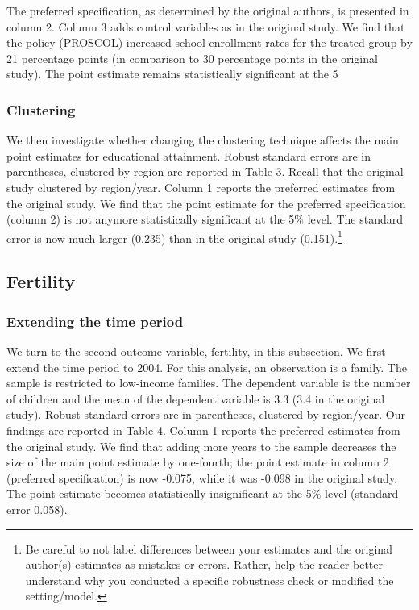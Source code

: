 \documentclass[12pt,a4paper]{article}
\begin{document}
The preferred specification, as determined by the original authors, is presented in column 2. Column 3 adds control variables as in the original study. We find that the policy (PROSCOL) increased school enrollment rates for the treated group by 21 percentage points (in comparison to 30 percentage points in the original study). The point estimate remains statistically significant at the 5%

\subsubsection{Clustering}

We then investigate whether changing the clustering technique affects the main point estimates for educational attainment. Robust standard errors are in parentheses, clustered by region are reported in Table 3. Recall that the original study clustered by region/year. Column 1 reports the preferred estimates from the original study. We find that the point estimate for the preferred specification (column 2) is not anymore statistically significant at the 5\% level. The standard error is now much larger (0.235) than in the original study (0.151).\footnote{Be careful to not label differences between your estimates and the original author(s) estimates as mistakes or errors. Rather, help the reader better understand why you conducted a specific robustness check or modified the setting/model.}

\subsection{Fertility}

\subsubsection{Extending the time period}

We turn to the second outcome variable, fertility, in this subsection. We first extend the time period to 2004. For this analysis, an observation is a family. The sample is restricted to low-income families. The dependent variable is the number of children and the mean of the dependent variable is 3.3 (3.4 in the original study). Robust standard errors are in parentheses, clustered by region/year. Our findings are reported in Table 4. Column 1 reports the preferred estimates from the original study.
We find that adding more years to the sample decreases the size of the main point estimate by one-fourth; the point estimate in column 2 (preferred specification) is now -0.075, while it was -0.098 in the original study. The point estimate becomes statistically insignificant at the 5\% level (standard error 0.058).
\end{document}
